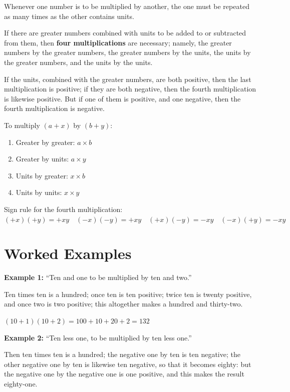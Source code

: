 \documentclass[11pt,a4paper,openany,oneside]{book}
\begin{document}
Whenever one number is to be multiplied by another, the one must be repeated
as many times as the other contains units.

If there are greater numbers combined with units to be added to or subtracted
from them, then \textbf{four multiplications} are necessary; namely, the
greater numbers by the greater numbers, the greater numbers by the units, the
units by the greater numbers, and the units by the units.

If the units, combined with the greater numbers, are both positive, then the
last multiplication is positive; if they are both negative, then the fourth
multiplication is likewise positive. But if one of them is positive, and one
negative, then the fourth multiplication is negative.

\begin{mathbox}[title={\textbf{The Fourfold Multiplication Rule}}]
To multiply $(a + x)$ by $(b + y)$:
\begin{enumerate}[label=\arabic*.,leftmargin=2em]
  \item Greater by greater: $a \times b$
  \item Greater by units: $a \times y$
  \item Units by greater: $x \times b$
  \item Units by units: $x \times y$
\end{enumerate}
Sign rule for the fourth multiplication:
$(+x)(+y) = +xy \quad (-x)(-y) = +xy \quad (+x)(-y) = -xy \quad (-x)(+y) = -xy$
\end{mathbox}

\section{Worked Examples}

\textbf{Example 1:} ``Ten and one to be multiplied by ten and two.''

Ten times ten is a hundred; once ten is ten positive; twice ten is twenty
positive, and once two is two positive; this altogether makes a hundred and
thirty-two.

$(10 + 1)(10 + 2) = 100 + 10 + 20 + 2 = 132$

\textbf{Example 2:} ``Ten less one, to be multiplied by ten less one.''

Then ten times ten is a hundred; the negative one by ten is ten negative; the
other negative one by ten is likewise ten negative, so that it becomes
eighty: but the negative one by the negative one is one positive, and this
makes the result eighty-one.
\end{document}
